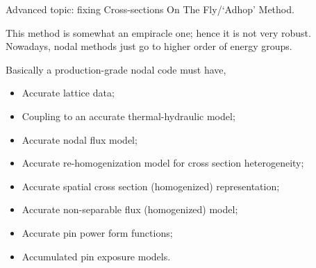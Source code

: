 \documentclass{school-22.211-notes}
\begin{document}
Advanced topic: fixing Cross-sections On The Fly/`Adhop' Method. 

This method is somewhat an empiracle one; hence it is not very robust. Nowadays, nodal methods just go to higher order of energy groups. 

\clearpage
{}
Basically a production-grade nodal code must have, 
\begin{itemize}
\item Accurate lattice data;
\item Coupling to an accurate thermal-hydraulic model;
\item Accurate nodal flux model;
\item Accurate re-homogenization model for cross section heterogeneity;
\item Accurate spatial cross section (homogenized) representation;
\item Accurate non-separable flux (homogenized) model;
\item Accurate pin power form functions;
\item Accumulated pin exposure models. 
\end{itemize}
\end{document}
